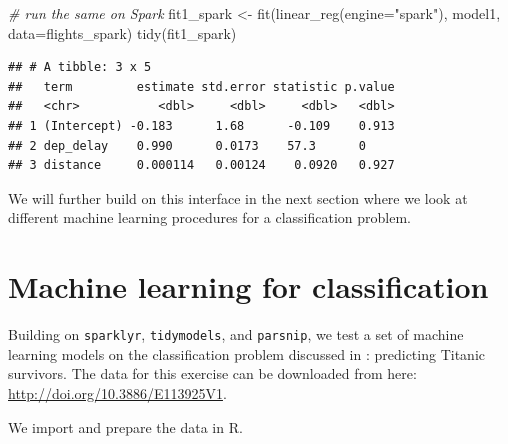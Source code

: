 \documentclass[
  12pt,
]{style/krantz}
\newenvironment{Shaded}{\begin{snugshade}}{\end{snugshade}}
\newcommand{\AttributeTok}[1]{\textcolor[rgb]{0.77,0.63,0.00}{#1}}
\newcommand{\CommentTok}[1]{\textcolor[rgb]{0.56,0.35,0.01}{\textit{#1}}}
\newcommand{\DecValTok}[1]{\textcolor[rgb]{0.00,0.00,0.81}{#1}}
\newcommand{\FunctionTok}[1]{\textcolor[rgb]{0.00,0.00,0.00}{#1}}
\newcommand{\NormalTok}[1]{#1}
\newcommand{\OtherTok}[1]{\textcolor[rgb]{0.56,0.35,0.01}{#1}}
\newcommand{\SpecialCharTok}[1]{\textcolor[rgb]{0.00,0.00,0.00}{#1}}
\newcommand{\StringTok}[1]{\textcolor[rgb]{0.31,0.60,0.02}{#1}}
\begin{document}
\begin{Shaded}
\begin{Highlighting}[]
\CommentTok{\# run the same on Spark }
\NormalTok{fit1\_spark }\OtherTok{\textless{}{-}} \FunctionTok{fit}\NormalTok{(}\FunctionTok{linear\_reg}\NormalTok{(}\AttributeTok{engine=}\StringTok{"spark"}\NormalTok{), model1, }\AttributeTok{data=}\NormalTok{flights\_spark)}
\FunctionTok{tidy}\NormalTok{(fit1\_spark)}
\end{Highlighting}
\end{Shaded}

\begin{verbatim}
## # A tibble: 3 x 5
##   term         estimate std.error statistic p.value
##   <chr>           <dbl>     <dbl>     <dbl>   <dbl>
## 1 (Intercept) -0.183      1.68      -0.109    0.913
## 2 dep_delay    0.990      0.0173    57.3      0    
## 3 distance     0.000114   0.00124    0.0920   0.927
\end{verbatim}

We will further build on this interface in the next section where we look at different machine learning procedures for a classification problem.

\hypertarget{machine-learning-for-classification}{%
\section{Machine learning for classification}\label{machine-learning-for-classification}}

Building on \texttt{sparklyr}, \texttt{tidymodels}, and \texttt{parsnip}, we test a set of machine learning models on the classification problem discussed in \citet{varian_2014}: predicting Titanic survivors. The data for this exercise can be downloaded from here: \url{http://doi.org/10.3886/E113925V1}.

We import and prepare the data in R.

\begin{Shaded}
\end{Shaded}
\end{document}
